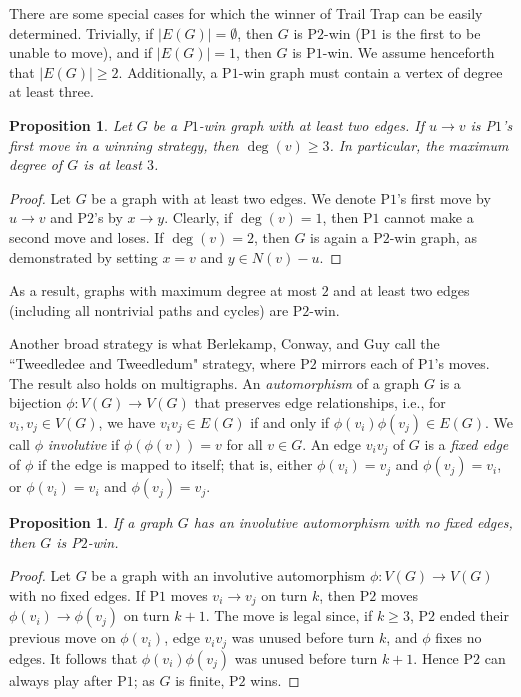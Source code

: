 \documentclass{article}
\theoremstyle{plain}
\newtheorem{proposition}[theorem]{Proposition}
\theoremstyle{definition}
\def\pone{{\rm{P}\ensuremath{1}}}
\def\ptwo{{\rm{P}\ensuremath{2}}}
\def\poneposs{{\rm{P}\ensuremath{1}'s}}
\def\ptwoposs{{\rm{P}\ensuremath{2}'s}}
\begin{document}
There are some special cases for which the winner of {\sc Trail Trap} can be easily determined. Trivially, if $|E(G)| = \emptyset$, then $G$ is \ptwo{}-win (\pone{} is the first to be unable to move), and if $|E(G)| = 1$, then $G$ is \pone{}-win. We assume henceforth that $|E(G)| \ge 2$. Additionally, a \pone{}-win graph must contain a vertex of degree at least three. 

\begin{proposition}
\label{lem:p1 loses on degree 1 and 2}
    Let $G$ be a \pone{}-win graph with at least two edges. If $u \to v$ is \poneposs{} first move in a winning strategy, then $\deg(v) \geq 3$.
    In particular, the maximum degree of $G$ is at least $3$.
\end{proposition}
\begin{proof}
    Let $G$ be a graph with at least two edges. We denote \poneposs{} first move by $u \to v$ and \ptwoposs{} by $x \to y$.
    Clearly, if $\deg(v) = 1$, then \pone{} cannot make a second move and loses.
    If $\deg(v) = 2$, then $G$ is again a \ptwo{}-win graph, as demonstrated by setting $x = v$ and $y \in N(v) - u$.
\end{proof}

As a result, graphs with maximum degree at most $2$ and at least two edges (including all nontrivial paths and cycles) are \ptwo{}-win. 

Another broad strategy is what Berlekamp, Conway, and Guy \cite{BeCoGu82} call the ``Tweedledee and Tweedledum" strategy, where \ptwo{} mirrors each of \pone{}'s moves. The result also holds on multigraphs. An \emph{automorphism} of a graph $G$ is a bijection $\phi: V(G) \rightarrow V(G)$ that preserves edge relationships, i.e., for $v_i, v_j \in V(G)$, we have $v_iv_j \in E(G)$ if and only if $\phi(v_i)\phi(v_j) \in E(G)$. We call $\phi$ \emph{involutive} if $\phi(\phi(v)) = v$ for all $v \in G$. An edge $v_iv_j$ of $G$ is a \emph{fixed edge} of $\phi$ if the edge is mapped to itself; that is, either $\phi(v_i) = v_j$ and $\phi(v_j) = v_i$, or $\phi(v_i) = v_i$ and $\phi(v_j) = v_j$.


\begin{proposition}
\label{prop:copycat_involution_strategy}
    If a graph $G$ has an involutive automorphism with no fixed edges, then $G$ is \ptwo{}-win.
\end{proposition}
\begin{proof}
    Let $G$ be a graph with an involutive automorphism $\phi: V(G) \rightarrow V(G)$ with no fixed edges. If \pone{} moves $v_{i} \to v_j$ on turn $k$, then \ptwo{} moves $\phi(v_{i}) \to \phi(v_j)$ on turn $k+1$. The move is legal since, if $k \ge 3$, \ptwo{} ended their previous move on $\phi(v_{i})$, edge $v_{i}v_j$ was unused before turn $k$, and $\phi$ fixes no edges. It follows that $\phi(v_{i})\phi(v_j)$ was unused before turn $k+1$. Hence \ptwo{} can always play after \pone{}; as $G$ is finite, \ptwo{} wins. 
\end{proof}
\end{document}
